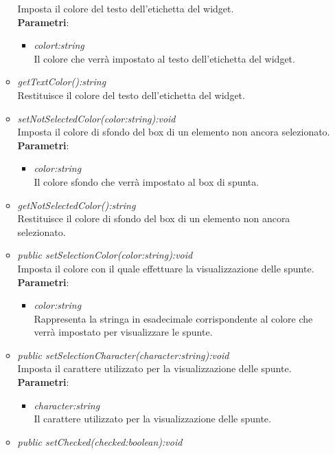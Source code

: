 \begin{itemize}
\begin{itemize}
		Imposta il colore del testo dell'etichetta del widget.
		\\ \textbf{Parametri}: \begin{itemize}
		\item \textit{colort:string}\\
		Il colore che verrà impostato al testo dell'etichetta del widget.
		\end{itemize}
		\item \textit{getTextColor():string}\\
		Restituisce il colore del testo dell'etichetta del widget.
		\item \textit{setNotSelectedColor(color:string):void}\\
		Imposta il colore di sfondo del box di un elemento non ancora selezionato.
		\\ \textbf{Parametri}: \begin{itemize}
		\item \textit{color:string}\\
		Il colore sfondo che verrà impostato al box di spunta.
		\end{itemize}
		\item \textit{getNotSelectedColor():string}\\
		Restituisce il colore di sfondo del box di un elemento non ancora selezionato.
	\item \textit{public setSelectionColor(color:string):void}\\
	Imposta il colore con il quale effettuare la visualizzazione delle spunte.
		\\ \textbf{Parametri}: \begin{itemize}
		\item \textit{color:string}\\
		Rappresenta la stringa in esadecimale corrispondente al colore che verrà impostato per visualizzare le spunte.
		\end{itemize}  
	\item \textit{public setSelectionCharacter(character:string):void}\\
	Imposta il carattere utilizzato per la visualizzazione delle spunte.
		\\ \textbf{Parametri}: \begin{itemize}
		\item \textit{character:string}\\
		Il carattere utilizzato per la visualizzazione delle spunte.
		\end{itemize} 
	\item \textit{public setChecked(checked:boolean):void}\\

\end{itemize}
\end{itemize}
